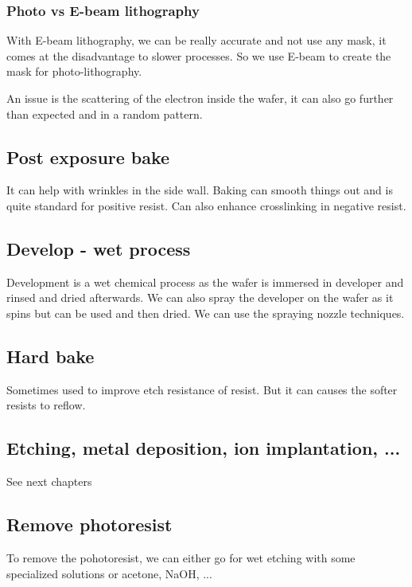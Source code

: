 \documentclass{report}
\begin{document}
\subsubsection{Photo vs E-beam lithography}

With E-beam lithography, we can be really accurate and not use any mask, it comes at the disadvantage to slower processes. So we use E-beam to create the mask for photo-lithography.

An issue is the scattering of the electron inside the wafer, it can also go further than expected and in a random pattern.

\subsection{Post exposure bake}

It can help with wrinkles in the side wall. Baking can smooth things out and is quite standard for positive resist. Can also enhance crosslinking in negative resist.

\subsection{Develop - wet process}

Development is a wet chemical process as the wafer is immersed in developer and rinsed and dried afterwards. We can also spray the developer on the wafer as it spins but can be used and then dried. We can use the spraying nozzle techniques.

\subsection{Hard bake}

Sometimes used to improve etch resistance of resist. But it can causes the softer resists to reflow.

\subsection{Etching, metal deposition, ion implantation, ...}

See next chapters

\subsection{Remove photoresist}

To remove the pohotoresist, we can either go for wet etching with some specialized solutions or acetone, NaOH, ...
\end{document}
